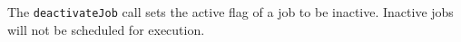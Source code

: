 The \verb+deactivateJob+ call sets the active flag of a job to be inactive. Inactive jobs will not be
scheduled for execution.
